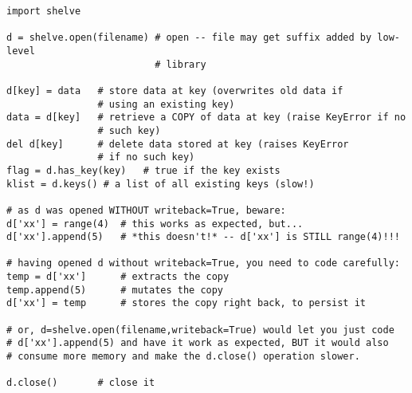 \begin{verbatim}
import shelve

d = shelve.open(filename) # open -- file may get suffix added by low-level
                          # library

d[key] = data   # store data at key (overwrites old data if
                # using an existing key)
data = d[key]   # retrieve a COPY of data at key (raise KeyError if no
                # such key)
del d[key]      # delete data stored at key (raises KeyError
                # if no such key)
flag = d.has_key(key)   # true if the key exists
klist = d.keys() # a list of all existing keys (slow!)

# as d was opened WITHOUT writeback=True, beware:
d['xx'] = range(4)  # this works as expected, but...
d['xx'].append(5)   # *this doesn't!* -- d['xx'] is STILL range(4)!!!

# having opened d without writeback=True, you need to code carefully:
temp = d['xx']      # extracts the copy
temp.append(5)      # mutates the copy
d['xx'] = temp      # stores the copy right back, to persist it

# or, d=shelve.open(filename,writeback=True) would let you just code
# d['xx'].append(5) and have it work as expected, BUT it would also
# consume more memory and make the d.close() operation slower.

d.close()       # close it
\end{verbatim}

\begin{seealso}
\end{seealso}

